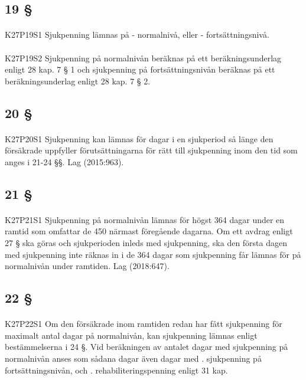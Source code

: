 \documentclass[a4paper,notitlepage,openany,10pt]{book}
\begin{document}
\subsection*{19 §}
\paragraph*{}
{\tiny K27P19S1}
Sjukpenning lämnas på
\newline - normalnivå, eller
\newline - fortsättningsnivå.
\paragraph*{}
{\tiny K27P19S2}
Sjukpenning på normalnivån beräknas på ett beräkningsunderlag enligt 28 kap. 7 § 1 och sjukpenning på fortsättningsnivån beräknas på ett beräkningsunderlag enligt 28 kap. 7 § 2.
\subsection*{20 §}
\paragraph*{}
{\tiny K27P20S1}
Sjukpenning kan lämnas för dagar i en sjukperiod så länge den försäkrade uppfyller förutsättningarna för rätt till sjukpenning inom den tid som anges i 21-24 §§.
Lag (2015:963).
\subsection*{21 §}
\paragraph*{}
{\tiny K27P21S1}
Sjukpenning på normalnivån lämnas för högst 364 dagar under en ramtid som omfattar de 450 närmast föregående dagarna. Om ett avdrag enligt 27 § ska göras och sjukperioden inleds med sjukpenning, ska den första dagen med sjukpenning inte räknas in i de 364 dagar som sjukpenning får lämnas för på normalnivån under ramtiden.
Lag (2018:647).
\subsection*{22 §}
\paragraph*{}
{\tiny K27P22S1}
Om den försäkrade inom ramtiden redan har fått sjukpenning för maximalt antal dagar på normalnivån, kan sjukpenning lämnas enligt bestämmelserna i 24 §. Vid beräkningen av antalet dagar med sjukpenning på normalnivån anses som sådana dagar även dagar med
. sjukpenning på fortsättningsnivån, och
. rehabiliteringspenning enligt 31 kap.
\end{document}
